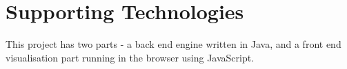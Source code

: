 \documentclass[ %
                    author={Alexander Hill},
                supervisor={Dr. Benjamin Sach},
                    degree={MEng},
                     title={MARMOSET},
                  subtitle={Multi-Agent Route Management using Online Simulation for Efficient Transportation},
                      type={research},
                      year={2016} ]{dissertation}
\begin{document}





\chapter*{Supporting Technologies}

\noindent
This project has two parts - a back end engine written in Java, and a front end
visualisation part running in the browser using JavaScript.
\end{document}
